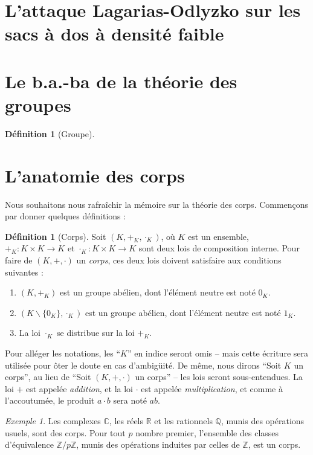 \documentclass[a4paper, titlepage]{article}
\theoremstyle{definition}
\newtheorem{defi}[theo]{Définition}
\theoremstyle{remark}
\newtheorem{exem}[theo]{Exemple}
\def\Z{\mathbb Z}
\def\Q{\mathbb Q}
\def\R{\mathbb R}
\def\C{\mathbb C}
\begin{document}
\section{L'attaque Lagarias-Odlyzko sur les sacs à dos à densité faible}

\newpage
\appendix

\section{Le b.a.-ba de la théorie des groupes}
\begin{defi}[Groupe]

\end{defi}

\section{L'anatomie des corps}

Nous souhaitons nous rafraîchir la mémoire sur la théorie des corps. Commençons par donner quelques définitions :

\begin{defi}[Corps]
Soit $(K,+_K,\cdot_K)$, où $K$ est un ensemble, $+_K : K \times K \rightarrow K$ et $\cdot_K: K \times K \rightarrow K$ sont deux lois de composition interne. Pour faire de $(K,+,\cdot)$ un \textit{corps}, ces deux lois doivent satisfaire aux conditions suivantes : \begin{enumerate}
\item $(K,+_K)$ est un groupe abélien, dont l'élément neutre est noté $0_K$.
\item $(K\backslash \{0_K\},\cdot_K)$ est un groupe abélien, dont l'élément neutre est noté $1_K$.
\item La loi $\cdot_K$ se distribue sur la loi $+_K$.
\end{enumerate}
\end{defi}

Pour alléger les notations, les ``$K$'' en indice seront omis -- mais cette écriture sera utilisée pour ôter le doute en cas d’ambigüité. De même, nous dirons ``Soit $K$ un corps'', au lieu de ``Soit $(K,+,\cdot)$ un corps'' -- les lois seront sous-entendues. La loi $+$ est appelée \textit{addition}, et la loi $\cdot$ est appelée \textit{multiplication}, et comme à l'accoutumée, le produit $a\cdot b$ sera noté $ab$.

\begin{exem}
Les complexes $\C$, les réels $\R$ et les rationnels $\Q$, munis des opérations usuels, sont des corps. Pour tout $p$ nombre premier, l'ensemble des classes d'équivalence $\Z/p\Z$, munis des opérations induites par celles de $\Z$, est un corps.
\end{exem}
\end{document}

